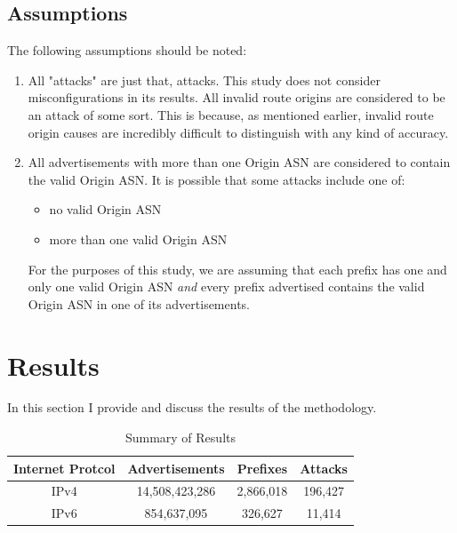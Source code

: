 \subsection{Assumptions}
The following assumptions should be noted:
\begin{enumerate}
    \item All "attacks" are just that, attacks. This study does not consider
        misconfigurations in its results. All invalid route origins are
        considered to be an attack of some sort. This is because, as mentioned
        earlier, invalid route origin causes are incredibly difficult to
        distinguish with any kind of accuracy.
    \item All advertisements with more than one Origin ASN are considered to
        contain the valid Origin ASN. It is possible that some attacks
        include one of:
        \begin{itemize}
            \item no valid Origin ASN
            \item more than one valid Origin ASN
        \end{itemize}
        For the purposes of this study, we are assuming that each prefix has one
        and only one valid Origin ASN {\em and} every prefix advertised contains
        the valid Origin ASN in one of its advertisements.
\end{enumerate}

\section{Results}
In this section I provide and discuss the results of the methodology.

\begin{table}[tp]
    \begin{tabular}{c | c | c | c }
        Internet Protcol & Advertisements & Prefixes & Attacks \\
        \hline
        IPv4 & 14,508,423,286 & 2,866,018 & 196,427 \\
        IPv6 & 854,637,095 & 326,627 & 11,414
    \end{tabular}
    \caption{Summary of Results}
\end{table}

